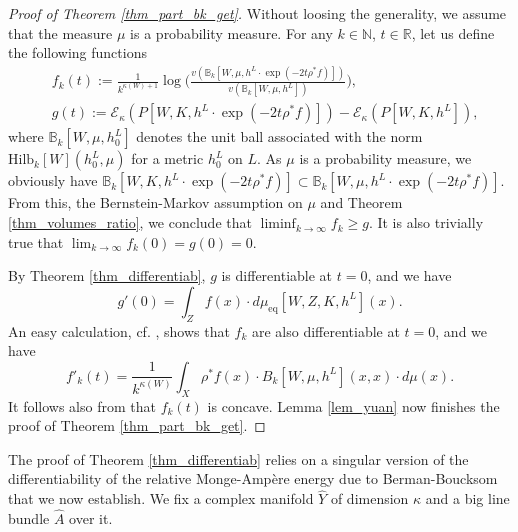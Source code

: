 \documentclass[12pt]{article}
\numberwithin{equation}{section}
\theoremstyle{theorem}
\theoremstyle{definition}
\theoremstyle{remark}
\newcommand{\vol}{v}
\newcommand{\real}{\mathbb{R}}
\newcommand{\nat}{\mathbb{N}}
\begin{document}
	\begin{proof}[Proof of Theorem \ref{thm_part_bk_get}]
		Without loosing the generality, we assume that the measure $\mu$ is a probability measure.
		For any $k \in \nat$, $t \in \real$, let us define the following functions
		\begin{equation}
		\begin{aligned}
			&
			f_k(t) 
			:= 
			\frac{1}{k^{\kappa(W) + 1}} 
				\log \Big(  \frac{\vol(\mathbb{B}_k[W, \mu, h^L \cdot \exp(- 2 t \rho^* f)])}{\vol(\mathbb{B}_k[W, \mu, h^L])}			
			\Big),
			\\
			&
			g(t) 
			:= 
			\mathscr{E}_{\kappa}(P[W, K, h^L \cdot \exp(- 2 t \rho^* f)])
			-
			\mathscr{E}_{\kappa}(P[W, K, h^L]),
		\end{aligned}
		\end{equation}
		where $\mathbb{B}_k[W, \mu, h^L_0]$ denotes the unit ball associated with the norm ${\textrm{Hilb}}_k[W](h^L_0, \mu)$ for a metric $h^L_0$ on $L$.
		As $\mu$ is a probability measure, we obviously have $\mathbb{B}_k[W, K, h^L \cdot \exp(- 2 t \rho^* f)] \subset \mathbb{B}_k[W, \mu, h^L \cdot \exp(- 2 t \rho^* f)]$.
		From this, the Bernstein-Markov assumption on $\mu$ and Theorem \ref{thm_volumes_ratio}, we conclude that $\liminf_{k \to \infty} f_k \geq g$.
		It is also trivially true that $\lim_{k \to \infty} f_k(0) = g(0) = 0$.
		\par 
		By Theorem \ref{thm_differentiab}, $g$ is differentiable at $t = 0$, and we have
		\begin{equation}
			g'(0) 
			=
			\int_Z f(x) \cdot d \mu_{\mathrm{eq}}[W, Z, K, h^L](x).
		\end{equation}
		An easy calculation, cf. \cite[Lemma 4.1]{BermanBouckBalls}, shows that $f_k$ are also differentiable at $t = 0$, and we have
		\begin{equation}
			f'_k(t)
			=
			\frac{1}{k^{\kappa(W)}}
			\int_X
			\rho^* f(x) \cdot 
			B_k[W, \mu, h^L](x, x) \cdot d\mu(x).
		\end{equation}
		It follows also from \cite[Proposition 2.4]{BerBoucNys} that $f_k(t)$ is concave.
		Lemma \ref{lem_yuan} now finishes the proof of Theorem \ref{thm_part_bk_get}.
	\end{proof}
	\par 
	The proof of Theorem \ref{thm_differentiab} relies on a singular version of the differentiability of the relative Monge-Ampère energy due to Berman-Boucksom \cite{BermanBouckBalls} that we now establish.
	We fix a complex manifold $\widehat{Y}$ of dimension $\kappa$ and a big line bundle $\widehat{A}$ over it.
\end{document}
